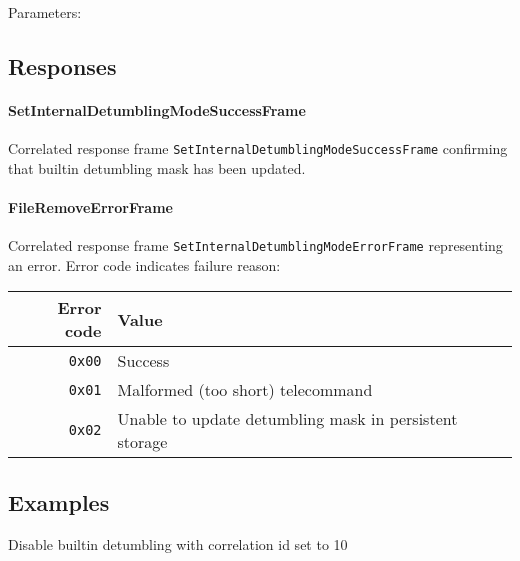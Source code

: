 Parameters: 

\begin{tcarglist}
\end{tcarglist}

\subsection{Responses}
\paragraph{SetInternalDetumblingModeSuccessFrame}
Correlated response frame \texttt{SetInternalDetumblingModeSuccessFrame} confirming 
that builtin detumbling mask has been updated.

\paragraph{FileRemoveErrorFrame}
Correlated response frame \texttt{SetInternalDetumblingModeErrorFrame} representing an error. 
Error code indicates failure reason:

\begin{tabular}{r | l}
    Error code & Value \\
    \hline
    \texttt{0x00}   & Success \\
    \texttt{0x01}   & Malformed (too short) telecommand \\
    \texttt{0x02}   & Unable to update detumbling mask in persistent storage \\
\end{tabular}

\subsection{Examples}
Disable builtin detumbling with correlation id set to 10


